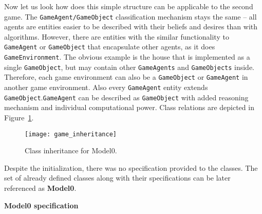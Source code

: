 Now let us look how does this simple structure can be applicable to the second game. The \texttt{GameAgent/GameObject} classification mechanism stays the same -- all agents are entities  easier to be described with their beliefs and desires than with algorithms. However, there are entities with the similar functionality to \texttt{GameAgent} or \texttt{GameObject} that encapsulate other agents, as it does \texttt{GameEnvironment}. The obvious example is the house  that is implemented as a single \texttt{GameObject}, but may contain other \texttt{GameAgents} and \texttt{GameObjects} inside. Therefore, each game environment can also be a \texttt{GameObject} or \texttt{GameAgent} in another game environment. Also every \texttt{GameAgent} entity extends \texttt{GameObject}.\texttt{GameAgent} can be described as \texttt{GameObject} with added reasoning mechanism and individual computational power. Class relations are depicted in Figure~\ref{ClassInh}.
 \begin{figure}[h!]
    \begin{center}
      \texttt{[image: game\_inheritance]}
      \caption{Class inheritance for Model0.}
      \label{ClassInh}
     \end{center}
    \end{figure}
Despite the initialization, there was no specification provided to the classes. The set of already defined classes along with their specifications can be later referenced as \textbf{Model0}.
\begin{center}
    \textbf{Model0 specification}
\end{center}
